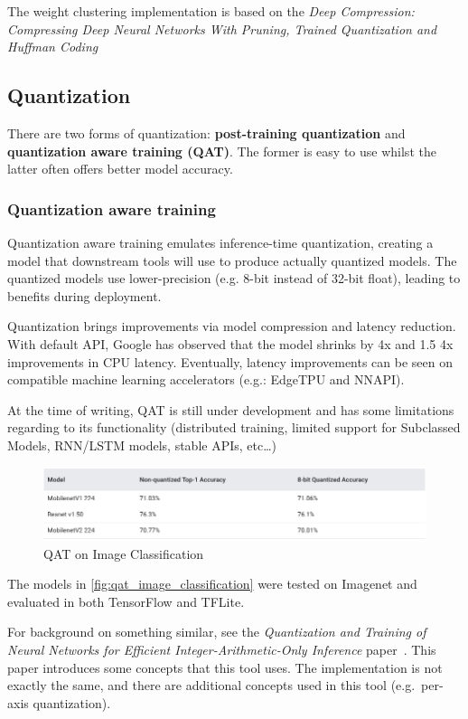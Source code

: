 The weight clustering implementation is based on the \textit{Deep Compression:
Compressing Deep Neural Networks With Pruning, Trained Quantization and Huffman
Coding}~\cite{han2015deep}~\cite{tfmot:clustering}

\subsection{Quantization}
There are two forms of quantization: \textbf{post-training quantization} and
\textbf{quantization aware training (QAT)}. The former is easy to use whilst
the latter often offers better model accuracy.

\subsubsection{Quantization aware training}
Quantization aware training emulates inference-time quantization, creating a
model that downstream tools will use to produce actually quantized models. The
quantized models use lower-precision (e.g. 8-bit instead of 32-bit float),
leading to benefits during deployment.

Quantization brings improvements via model compression and latency reduction.
With default API, Google has observed that the model shrinks by 4x and 1.5 \-
4x improvements in CPU latency. Eventually, latency improvements can be seen on
compatible machine learning accelerators (e.g.: EdgeTPU and NNAPI).

At the time of writing, QAT is still under development and has some limitations
regarding to its functionality (distributed training, limited support for
Subclassed Models, RNN/LSTM models, stable APIs, etc\ldots)

\begin{figure}[ht]
    \includegraphics[width=\textwidth]{images/introduction/qat_image_classification.png}
    \centering
    \caption{QAT on Image Classification}\label{fig:qat_image_classification}
\end{figure}

The models in \autoref{fig:qat_image_classification} were tested on Imagenet
and evaluated in both TensorFlow and TFLite.

For background on something similar, see the \textit{Quantization and Training
of Neural Networks for Efficient Integer-Arithmetic-Only Inference}
paper~\cite{Jacob_2018}.
This paper introduces some concepts that this tool uses.
The implementation is not exactly the same, and there are additional concepts
used in this tool (e.g.\ per-axis quantization).~\cite{tfmot:quantization_training}

